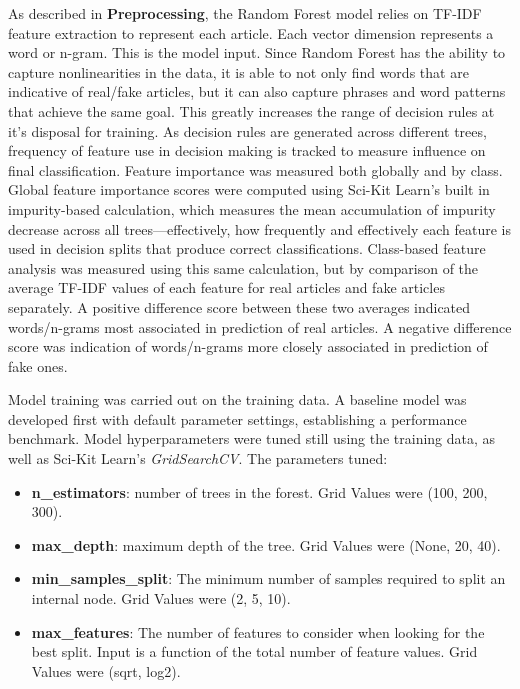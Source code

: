 \documentclass{article}
\begin{document}
As described in \textbf{Preprocessing}, the Random Forest model relies on TF-IDF feature extraction to represent each article. Each vector dimension represents a word or n-gram. This is the model input. Since Random Forest has the ability to capture nonlinearities in the data, it is able to not only find words that are indicative of real/fake articles, but it can also capture phrases and word patterns that achieve the same goal. This greatly increases the range of decision rules at it’s disposal for training. As decision rules are generated across different trees, frequency of feature use in decision making is tracked to measure influence on final classification. Feature importance was measured both globally and by class. Global feature importance scores were computed using Sci-Kit Learn’s built in impurity-based calculation, which measures the mean accumulation of impurity decrease across all trees—effectively, how frequently and effectively each feature is used in decision splits that produce correct classifications. Class-based feature analysis was measured using this same calculation, but by comparison of the average TF-IDF values of each feature for real articles and fake articles separately. A positive difference score between these two averages indicated words/n-grams most associated in prediction of real articles. A negative difference score was indication of words/n-grams more closely associated in prediction of fake ones. 

Model training was carried out on the training data. A baseline model was developed first with default parameter settings, establishing a performance benchmark. Model hyperparameters were tuned still using the training data, as well as Sci-Kit Learn’s {\it GridSearchCV}. The parameters tuned:

\begin{itemize}
    \item \textbf{n\_estimators}: number of trees in the forest. Grid Values were (100, 200, 300).

    \item \textbf{max\_depth}: maximum depth of the tree. Grid Values were (None, 20, 40).

    \item \textbf{min\_samples\_split}: The minimum number of samples required to split an internal node. Grid Values were (2, 5, 10).

    \item \textbf{max\_features}: The number of features to consider when looking for the best split. Input is a function of the total number of feature values. Grid Values were (sqrt, log2).
    
\end{itemize}
\end{document}
